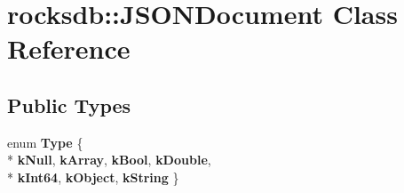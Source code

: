 \hypertarget{classrocksdb_1_1JSONDocument}{}\section{rocksdb\+:\+:J\+S\+O\+N\+Document Class Reference}
\label{classrocksdb_1_1JSONDocument}
\subsection*{Public Types}
\begin{DoxyCompactItemize}
\item 
enum {\bfseries Type} \{ \\*
{\bfseries k\+Null}, 
{\bfseries k\+Array}, 
{\bfseries k\+Bool}, 
{\bfseries k\+Double}, 
\\*
{\bfseries k\+Int64}, 
{\bfseries k\+Object}, 
{\bfseries k\+String}
 \}\hypertarget{classrocksdb_1_1JSONDocument_a7a57b72ea9075589151ee9e8aff1ddf8}{}\label{classrocksdb_1_1JSONDocument_a7a57b72ea9075589151ee9e8aff1ddf8}

\end{DoxyCompactItemize}
